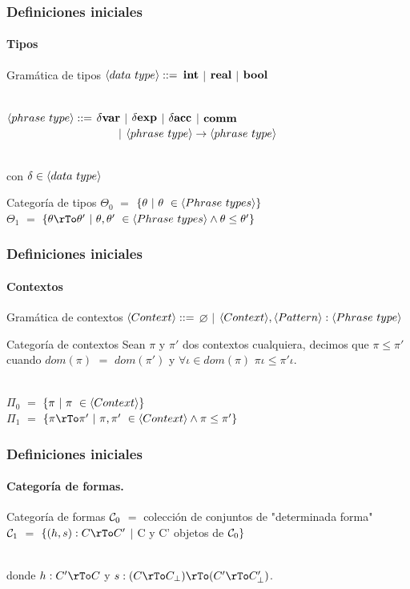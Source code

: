 \documentclass{beamer} %
\begin{document}
\begin{frame}
\frametitle{Definiciones iniciales}
\framesubtitle{Tipos}

\begin{block}{Gram\'atica de tipos}
$\langle data \ type \rangle ::=$ $\textbf{int}$ $|$ $\textbf{real}$ $|$ $\textbf{bool}$\\
\

$\langle phrase \ type \rangle::=$ $\delta \textbf{var}$ $|$ $\delta \textbf{exp}$ $|$ $\delta \textbf{acc}$ $|$ $\textbf{comm}$\\
\ \ \ \ \ \ \ \ \ \ \ \ \ \ \ \ \ \ \ \ 
$|$ $\langle phrase \ type \rangle \rightarrow \langle phrase \ type \rangle$ \\
\

con $\delta \in \lrangles{data \ type}$\\
\end{block}

\begin{block}{Categor\'ia de tipos}
$\Theta_0$ $=$ $\{\theta \ | \ \theta \ \in \langle Phrase \ types \rangle \}$\\
$\Theta_1$ $=$ $\{\theta \rTo \theta' \ | \ \theta,\theta' \ \in \lrangles{Phrase \ types} \wedge \theta \leq \theta' \}$\\
\end{block}
\end{frame}

\begin{frame}
\frametitle{Definiciones iniciales}
\framesubtitle{Contextos}

\begin{block}{Gram\'atica de contextos}
$\langle Context \rangle::=$ $\varnothing$ $|$ $\langle Context \rangle, \langle Pattern \rangle:\langle Phrase \ type \rangle$
\end{block}

\begin{block}{Categor\'ia de contextos}
Sean $\pi$ y $\pi'$ dos contextos cualquiera, decimos que 
$\pi \leq \pi'$ cuando $dom(\pi)$ $=$ $dom(\pi')$ y $\forall \iota \in dom(\pi)$ 
$\pi \iota \leq \pi' \iota$. \\
\

$\Pi_0$ $=$ $\{\pi \ | \ \pi \ \in \langle Context \rangle \}$\\
$\Pi_1$ $=$ $\{\pi \rTo \pi' \ | \ \pi,\pi' \ \in \lrangles{Context} \wedge \pi \leq \pi' \}$\\
\end{block}
\end{frame}

\begin{frame}
\frametitle{Definiciones iniciales}
\framesubtitle{Categor\'ia de formas.}

\begin{block}{Categor\'ia de formas}
$\mathcal{C}_0$ $=$ colecci\'on de conjuntos de "determinada forma"\\
$\mathcal{C}_1$ $=$ $\{(h,s): C \rTo C' $ $|$  C y C' objetos de $\mathcal{C}_0 \}$ \\
\

donde $h : C' \rTo C$ y $s : (C \rTo C_\bot) \rTo (C' \rTo C'_\bot)$.\\
\end{block}

\end{frame}
\end{document}
